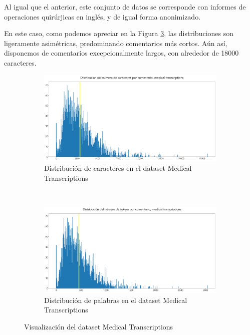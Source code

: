 Al igual que el anterior, este conjunto de datos se corresponde con informes de operaciones quirúrjicas en inglés, y de igual forma anonimizado.

En este caso, como podemos apreciar en la Figura \ref{fig:sum_mdtr}, las distribuciones son ligeramente asimétricas, predominando comentarios más cortos. Aún así, disponemos de comentarios excepcionalmente largos, con alrededor de 18000 caracteres.

\begin{figure}[h!]
	\centering
	\begin{subfigure}[t]{0.95\textwidth}
		\centering
		\includegraphics[width=.9\textwidth]{media/char_hist_mdtr.pdf}
		\caption{Distribución de caracteres en el dataset Medical Transcriptions}
		\label{fig:char_hist_mdtr}
	\end{subfigure}

	~
	\begin{subfigure}[t]{0.95\textwidth}
		\centering
		\includegraphics[width=.9\textwidth]{media/token_hist_mdtr.pdf}
		\caption{Distribución de palabras en el dataset Medical Transcriptions}
		\label{fig:token_hist_mdtr}
	\end{subfigure}

	\caption{Visualización del dataset Medical Transcriptions}
	\label{fig:sum_mdtr}
\end{figure}

